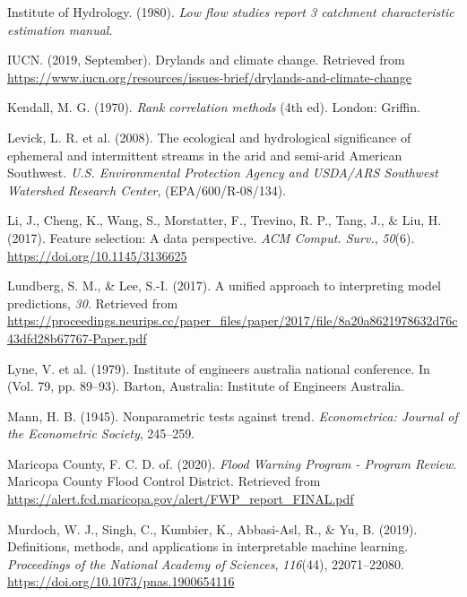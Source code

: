 \documentclass[
]{agujournal2019}
\newlength{\cslhangindent}
\newenvironment{CSLReferences}[2] %
 {\begin{list}{}{%
  \setlength{\itemindent}{0pt}
  \setlength{\leftmargin}{0pt}
  \setlength{\parsep}{0pt}
  \ifodd #1
   \setlength{\leftmargin}{\cslhangindent}
   \setlength{\itemindent}{-1\cslhangindent}
  \fi
  \setlength{\itemsep}{#2\baselineskip}}}
 {\end{list}}
\begin{document}
\begin{CSLReferences}{1}{0}
Institute of Hydrology. (1980). \emph{Low flow studies report 3
catchment characteristic estimation manual}.

IUCN. (2019, September). Drylands and climate change. Retrieved from
\url{https://www.iucn.org/resources/issues-brief/drylands-and-climate-change}

Kendall, M. G. (1970). \emph{Rank correlation methods} (4th ed). London:
Griffin.

Levick, L. R. et al. (2008). {The ecological and hydrological
significance of ephemeral and intermittent streams in the arid and
semi-arid American Southwest}. \emph{U.S. Environmental Protection
Agency and USDA/ARS Southwest Watershed Research Center},
(EPA/600/R-08/134).

Li, J., Cheng, K., Wang, S., Morstatter, F., Trevino, R. P., Tang, J.,
\& Liu, H. (2017). Feature selection: A data perspective. \emph{ACM
Comput. Surv.}, \emph{50}(6). \url{https://doi.org/10.1145/3136625}

Lundberg, S. M., \& Lee, S.-I. (2017). A unified approach to
interpreting model predictions, \emph{30}. Retrieved from
\url{https://proceedings.neurips.cc/paper_files/paper/2017/file/8a20a8621978632d76c43dfd28b67767-Paper.pdf}

Lyne, V. et al. (1979). Institute of engineers australia national
conference. In (Vol. 79, pp. 89--93). Barton, Australia: Institute of
Engineers Australia.

Mann, H. B. (1945). Nonparametric tests against trend.
\emph{Econometrica: Journal of the Econometric Society}, 245--259.

Maricopa County, F. C. D. of. (2020). \emph{{Flood Warning Program -
Program Review}}. Maricopa County Flood Control District. Retrieved from
\url{https://alert.fcd.maricopa.gov/alert/FWP_report_FINAL.pdf}

Murdoch, W. J., Singh, C., Kumbier, K., Abbasi-Asl, R., \& Yu, B.
(2019). Definitions, methods, and applications in interpretable machine
learning. \emph{Proceedings of the National Academy of Sciences},
\emph{116}(44), 22071--22080.
\url{https://doi.org/10.1073/pnas.1900654116}


\end{CSLReferences}
\end{document}
